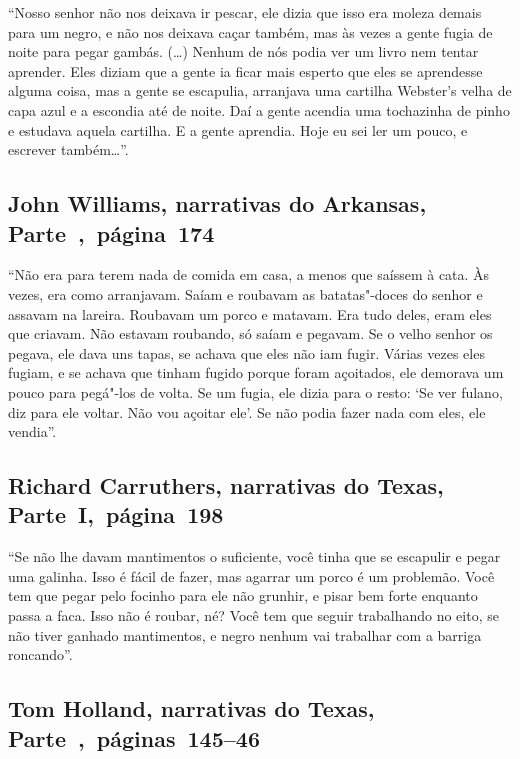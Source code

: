 ``Nosso senhor não nos deixava ir pescar, ele dizia que isso era moleza
demais para um negro, e não nos deixava caçar também, mas às vezes a
gente fugia de noite para pegar gambás. (\ldots{}) Nenhum de nós podia
ver um livro nem tentar aprender. Eles diziam que a gente ia ficar mais
esperto que eles se aprendesse alguma coisa, mas a gente se escapulia,
arranjava uma cartilha Webster's velha de capa azul e a escondia até de
noite. Daí a gente acendia uma tochazinha de pinho e estudava aquela
cartilha. E a gente aprendia. Hoje eu sei ler um pouco, e escrever
também\ldots{}''.

\subsection{John Williams, narrativas do Arkansas, Parte~,~página~174}
\label{ref292}

``Não era para terem nada de comida em casa, a menos que saíssem à cata.
Às vezes, era como arranjavam. Saíam e roubavam as batatas"-doces do
senhor e assavam na lareira. Roubavam um porco e matavam. Era tudo
deles, eram eles que criavam. Não estavam roubando, só saíam e pegavam.
Se o velho senhor os pegava, ele dava uns tapas, se achava que eles
não iam fugir. Várias vezes eles fugiam, e se achava que tinham fugido
porque foram açoitados, ele demorava um pouco para pegá"-los de volta. Se
um fugia, ele dizia para o resto: `Se ver fulano, diz para ele voltar.
Não vou açoitar ele'. Se não podia fazer nada com eles, ele vendia''.

\subsection{Richard Carruthers, narrativas do Texas, Parte~I,~página~198} \label{ref50}

``Se não lhe davam mantimentos o suficiente, você tinha que se escapulir
e pegar uma galinha. Isso é fácil de fazer, mas agarrar um porco é um
problemão. Você tem que pegar pelo focinho para ele não grunhir, e pisar
bem forte enquanto passa a faca. Isso não é roubar, né? Você tem que
seguir trabalhando no eito, se não tiver ganhado mantimentos, e negro
nenhum vai trabalhar com a barriga roncando''.

\subsection{Tom Holland, narrativas do Texas, Parte~,~páginas~145--46}
\label{ref148}

